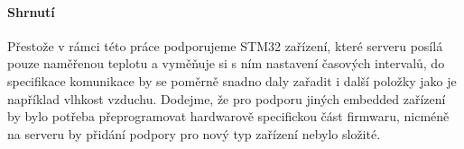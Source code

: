\paragraph{Shrnutí}
Přestože v rámci této práce podporujeme  STM32 zařízení, které serveru posílá pouze naměřenou
teplotu a vyměňuje si s ním nastavení časových intervalů, do specifikace komunikace by se poměrně
snadno daly zařadit i další položky jako je například vlhkost vzduchu.
Dodejme, že pro podporu jiných embedded zařízení by bylo potřeba přeprogramovat hardwarově specifickou
část firmwaru, nicméně na serveru by přidání podpory pro nový typ zařízení nebylo složité.


